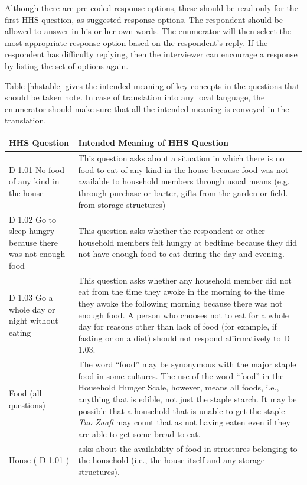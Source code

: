 \documentclass[a4paper]{refart}
\newenvironment{fulltable}[1][tbp]
 {\begin{table}[#1]%
  \hspace*{-\leftmarginwidth}%
  \begin{minipage}{\fullwidth}}
 {\end{minipage}\end{table}}
\begin{document}
Although there are pre-coded response options, these should be read only for the first HHS question, as suggested response options. The respondent should be allowed to answer in his or her own words. The enumerator will then select the most appropriate response option based on the respondent’s reply. If the respondent has difficulty replying, then the interviewer can encourage a response by listing the set of options again.

Table \ref{hhstable} gives the intended meaning of key concepts in the questions that should be taken note. In case of translation into any local language, the enumerator should make sure that all the intended meaning is conveyed in the translation.

\begin{fulltable}
\begin{tabularx}{\textwidth}{| X | X |} \hline
HHS Question & Intended Meaning of HHS Question \\ \hline \hline
D 1.01 No food of any kind in the house &
This question asks about a situation in which there is no food to eat of any kind in the house because food was not available to household members through usual means (e.g. through purchase or barter, gifts from the garden or field. from storage structures) \\ \hline
D 1.02 Go to sleep hungry because there was not enough food &
This question asks whether the respondent or other household members felt hungry at bedtime because they did not have enough food to eat during the day and evening.\\ \hline
D 1.03 Go a whole day or night without eating & 
This question asks whether any household member did not eat from the time they awoke in the morning to the time they awoke the following morning because there was not enough food. A person who chooses not to eat for a whole day for reasons other than lack of food (for example, if fasting or on a diet) should not respond affirmatively to D 1.03. \\ \hline
Food (all questions) &
The word ``food'' may be synonymous with the major staple food in some cultures. The use of the word ``food'' in the Household Hunger Scale, however, means all foods, i.e., anything that is edible, not just the staple starch. It may be possible that a household that is unable to get the staple \textit{Tuo Zaafi} may count that as not having eaten even if they are able to get some bread to eat. \\ \hline
House ( D 1.01 ) &
asks about the availability of food in structures belonging to the household (i.e., the house itself and any storage structures). \\ \hline

\end{tabularx}
\end{fulltable}
\end{document}
